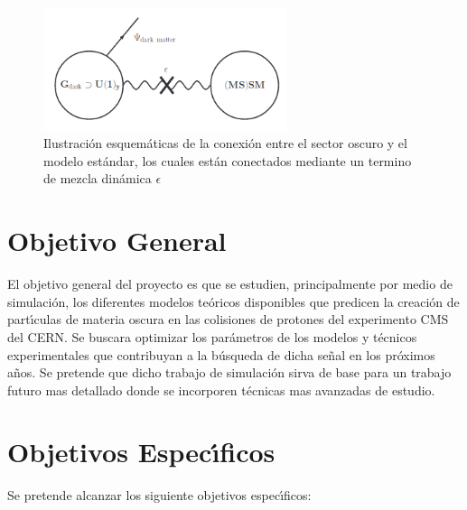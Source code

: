 \begin{figure}
\begin{center}
  \includegraphics[width=2.8in]{sketch_darksector.png}
  \caption{Ilustraci\'on esquem\'aticas de la conexi\'on entre el sector oscuro y el modelo est\'andar, los cuales est\'an conectados mediante un termino de mezcla din\'amica $\epsilon$}
  \label{fig:AMS_positron}
\end{center}
\end{figure}


\chapter{Objetivo General}

El objetivo general del proyecto es que se estudien, principalmente por medio de simulaci\'on, los diferentes modelos te\'oricos disponibles que predicen la creaci\'on de part\'{\i}culas de materia oscura en las colisiones de protones del experimento CMS del CERN.  Se buscara optimizar los par\'ametros de los modelos y t\'ecnicos experimentales que contribuyan a la b\'usqueda de dicha se\~nal en los pr\'oximos a\~nos.   Se pretende que dicho trabajo de simulaci\'on sirva de base para un trabajo futuro mas detallado donde se incorporen t\'ecnicas mas avanzadas de estudio. 


\chapter{Objetivos Espec\'{\i}ficos}

Se pretende alcanzar los siguiente objetivos espec\'{\i}ficos: 

